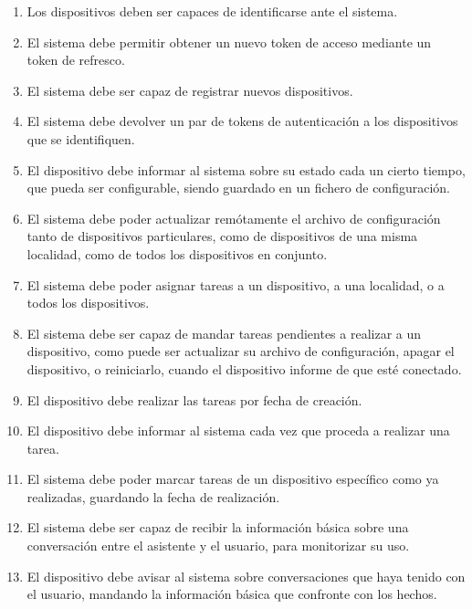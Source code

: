 \label{req.fun}
\begin{enumerate}[label=RF\arabic* -]
    \item Los dispositivos deben ser capaces de identificarse ante el sistema.

    \item El sistema debe permitir obtener un nuevo token de acceso mediante un token de refresco.

    \item El sistema debe ser capaz de registrar nuevos dispositivos.

    \item El sistema debe devolver un par de tokens de autenticación a los dispositivos que se identifiquen.

    \item El dispositivo debe informar al sistema sobre su estado cada un cierto tiempo, que pueda ser configurable, siendo guardado en un fichero de configuración.

    \item El sistema debe poder actualizar remótamente el archivo de configuración tanto de dispositivos particulares, como de dispositivos de una misma localidad, como de todos los dispositivos en conjunto.

    \item El sistema debe poder asignar tareas a un dispositivo, a una localidad, o a todos los dispositivos.

    \item El sistema debe ser capaz de mandar tareas pendientes a realizar a un dispositivo, como puede ser actualizar su archivo de configuración, apagar el dispositivo, o reiniciarlo, cuando el dispositivo informe de que esté conectado.

    \item El dispositivo debe realizar las tareas por fecha de creación.

    \item El dispositivo debe informar al sistema cada vez que proceda a realizar una tarea.

    \item El sistema debe poder marcar tareas de un dispositivo específico como ya realizadas, guardando la fecha de realización.

    \item El sistema debe ser capaz de recibir la información básica sobre una conversación entre el asistente y el usuario, para monitorizar su uso.

    \item El dispositivo debe avisar al sistema sobre conversaciones que haya tenido con el usuario, mandando la información básica que confronte con los hechos.


\end{enumerate}
